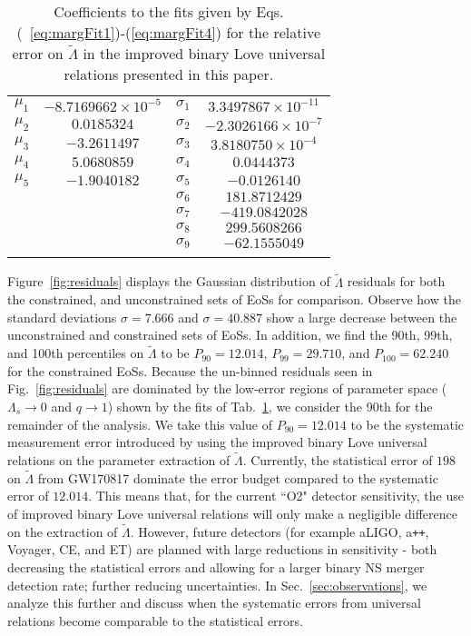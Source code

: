 \documentclass[prd,twocolumn,nofootinbib,superscriptaddress,amsmath,amssymb]{revtex4-1}
\begin{document}
\begin{table}
\centering
\caption{
Coefficients to the fits given by Eqs.(~\ref{eq:margFit1})-(\ref{eq:margFit4}) for the relative error on $\tilde{\Lambda}$ in the improved binary Love universal relations presented in this paper.
}\label{tab:marginalized}
\addtolength{\tabcolsep}{1pt} 
\begin{tabular}{ c | c || c | c}
\hline 
\noalign{\smallskip}
$\mu_1$ & $-8.7169662 \times 10^{-5}$ & $\sigma_1$ & $3.3497867 \times 10^{-11}$\\
$\mu_2$ & $0.0185324$ & $\sigma_2$ & $-2.3026166 \times 10^{-7}$\\
$\mu_3$ & $-3.2611497$ & $\sigma_3$ & $3.8180750 \times 10^{-4}$\\
$\mu_4$ & $5.0680859$ & $\sigma_4$ & $0.0444373$\\
$\mu_5$ & $-1.9040182$ & $\sigma_5$ & $-0.0126140$\\
 &  & $\sigma_6$ & $181.8712429$\\
 &  & $\sigma_7$ & $-419.0842028$\\
 &  & $\sigma_8$ & $299.5608266$\\
  &  & $\sigma_9$ & $-62.1555049$\\
 \noalign{\smallskip}
 \hline
\end{tabular}
\addtolength{\tabcolsep}{-1pt}
\end{table}

Figure~\ref{fig:residuals} displays the Gaussian distribution of $\tilde\Lambda$ residuals for both the constrained, and unconstrained sets of EoSs for comparison.
Observe how the standard deviations $\sigma=7.666$ and $\sigma=40.887$ show a large decrease between the unconstrained and constrained sets of EoSs.
In addition, we find the 90th, 99th, and 100th percentiles on $\tilde\Lambda$ to be $P_{90}=12.014$, $P_{99}=29.710$, and $P_{100}=62.240$ for the constrained EoSs.
Because the un-binned residuals seen in Fig.~\ref{fig:residuals} are dominated by the low-error regions of parameter space ($\Lambda_s \rightarrow 0$ and $q \rightarrow 1$) shown by the fits of Tab.~\ref{tab:marginalized}, we consider the 90th for the remainder of the analysis.
We take this value of $P_{90}=12.014$ to be the systematic measurement error introduced by using the improved binary Love universal relations on the parameter extraction of $\tilde\Lambda$.
Currently, the statistical error of $198$ on $\tilde\Lambda$ from GW170817 dominate the error budget compared to the systematic error of $12.014$.
This means that, for the current ``O2" detector sensitivity, the use of improved binary Love universal relations will only make a negligible difference on the extraction of $\tilde\Lambda$.
However, future detectors (for example aLIGO, a\texttt{++}, Voyager, CE, and ET) are planned with large reductions in sensitivity - both decreasing the statistical errors and allowing for a larger binary NS merger detection rate; further reducing uncertainties.
In Sec.~\ref{sec:observations}, we analyze this further and discuss when the systematic errors from universal relations become comparable to the statistical errors.
\end{document}
